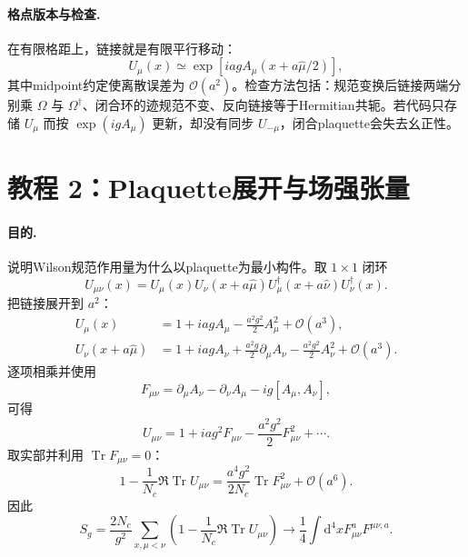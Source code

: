 \documentclass[UTF8,12pt,a4paper,twoside,openany]{ctexbook}
\newcommand{\dd}{\mathrm{d}}
\newcommand{\Tr}{\operatorname{Tr}}
\begin{document}
\paragraph{格点版本与检查.} 在有限格距上，链接就是有限平行移动：
\begin{equation}
  U_\mu(x)\simeq\exp\left[iagA_\mu(x+a\hat\mu/2)\right],
  \label{eq:tutorial-link-midpoint}
\end{equation}
其中midpoint约定使离散误差为 \(\mathcal O(a^2)\)。检查方法包括：规范变换后链接两端分别乘 \(\Omega\) 与 \(\Omega^\dagger\)、闭合环的迹规范不变、反向链接等于Hermitian共轭。若代码只存储 \(U_\mu\) 而按 \(\exp(igA_\mu)\) 更新，却没有同步 \(U_{-\mu}\)，闭合plaquette会失去幺正性。

\section{教程 2：Plaquette展开与场强张量}

\paragraph{目的.} 说明Wilson规范作用量为什么以plaquette为最小构件。取 \(1\times1\) 闭环
\begin{equation}
  U_{\mu\nu}(x)
  =U_\mu(x)U_\nu(x+a\hat\mu)
  U_\mu^\dagger(x+a\hat\nu)U_\nu^\dagger(x).
  \label{eq:tutorial-plaquette-loop}
\end{equation}
把链接展开到 \(a^2\)：
\begin{align}
  U_\mu(x)
  &=1+iagA_\mu-\frac{a^2g^2}{2}A_\mu^2+\mathcal O(a^3),\\
  U_\nu(x+a\hat\mu)
  &=1+iagA_\nu+\frac{a^2g}{2}\partial_\mu A_\nu
  -\frac{a^2g^2}{2}A_\nu^2+\mathcal O(a^3).
\end{align}
逐项相乘并使用
\begin{equation}
  F_{\mu\nu}=\partial_\mu A_\nu-\partial_\nu A_\mu-ig[A_\mu,A_\nu],
  \label{eq:tutorial-field-strength}
\end{equation}
可得
\begin{equation}
  U_{\mu\nu}
  =1+iag^2F_{\mu\nu}
  -\frac{a^2g^2}{2}F_{\mu\nu}^2+\cdots .
  \label{eq:tutorial-plaquette-expanded}
\end{equation}
取实部并利用 \(\Tr F_{\mu\nu}=0\)：
\begin{equation}
  1-\frac1{N_c}\Re\Tr U_{\mu\nu}
  =\frac{a^4g^2}{2N_c}\Tr F_{\mu\nu}^2
  +\mathcal O(a^6).
  \label{eq:tutorial-plaquette-action-density}
\end{equation}
因此
\begin{equation}
  S_g=\frac{2N_c}{g^2}\sum_{x,\mu<\nu}
  \left(1-\frac1{N_c}\Re\Tr U_{\mu\nu}\right)
  \longrightarrow\frac14\int\dd^4xF_{\mu\nu}^aF^{\mu\nu,a}.
  \label{eq:tutorial-gauge-continuum}
\end{equation}
\end{document}
